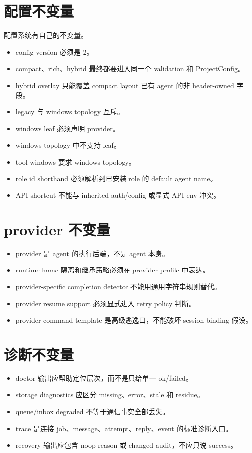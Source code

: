 \section{配置不变量}

配置系统有自己的不变量。

\begin{itemize}
  \item config version 必须是 2。
  \item compact、rich、hybrid 最终都要进入同一个 validation 和 ProjectConfig。
  \item hybrid overlay 只能覆盖 compact layout 已有 agent 的非 header-owned 字段。
  \item legacy  与 windows topology 互斥。
  \item windows leaf 必须声明 provider。
  \item windows topology 中不支持  leaf。
  \item tool windows 要求 windows topology。
  \item role id shorthand 必须解析到已安装 role 的 default agent name。
  \item API shortcut 不能与 inherited auth/config 或显式 API env 冲突。
\end{itemize}

\section{provider 不变量}

\begin{itemize}
  \item provider 是 agent 的执行后端，不是 agent 本身。
  \item runtime home 隔离和继承策略必须在 provider profile 中表达。
  \item provider-specific completion detector 不能用通用字符串规则替代。
  \item provider resume support 必须显式进入 retry policy 判断。
  \item provider command template 是高级逃逸口，不能破坏 session binding 假设。
\end{itemize}

\section{诊断不变量}

\begin{itemize}
  \item doctor 输出应帮助定位层次，而不是只给单一 ok/failed。
  \item storage diagnostics 应区分 missing、error、stale 和 residue。
  \item queue/inbox degraded 不等于通信事实全部丢失。
  \item trace 是连接 job、message、attempt、reply、event 的标准诊断入口。
  \item recovery 输出应包含 noop reason 或 changed audit，不应只说 success。
\end{itemize}

